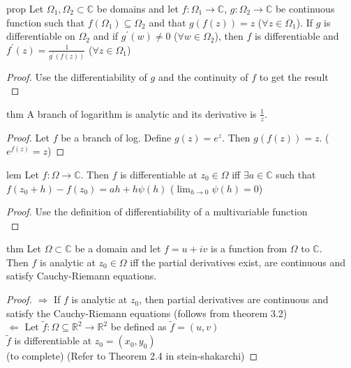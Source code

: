 \begin{restatable}[]{prop}{}\label{}
Let $\Omega_1,\Omega_2 \subset \mathds{C}$ be domains and let $f:\Omega_1\rightarrow \mathds{C}$,
$g:\Omega_2\rightarrow \mathds{C}$ be continuous function such that $f(\Omega_1)\subseteq \Omega_2$ and that $g(f(z))=z$ ($\forall z\in \Omega_1$).
If $g$ is differentiable on $\Omega_2$ and if $g^{'}(w)\neq 0$ ($\forall w \in \Omega_2$), then $f$ is differentiable and $f^{'}(z)=\frac{1}{g^{'}(f(z))}$ ($\forall z\in \Omega_1$)
\end{restatable}
\begin{proof}
Use the differentiability of $g$ and the continuity of $f$ to get the result \\
\end{proof}
\begin{restatable}[]{thm}{}\label{}
A branch of logarithm is analytic and its derivative is $\frac{1}{z}$.
\end{restatable}
\begin{proof}
Let $f$ be a branch of log. Define $g(z)=e^z$. Then $g(f(z))=z$. ($e^{f(z)}=z$)
\end{proof}
\begin{restatable}[]{lem}{}\label{}
Let $f:\Omega \rightarrow \mathds{C}$. Then $f$ is differentiable at $z_0\in \Omega$ iff $\exists a\in \mathds{C}$ such that \\
$f(z_0+h)-f(z_0)= ah+h\psi(h)$ ($\lim_{h \to 0} \psi(h)=0$)
\end{restatable}
\begin{proof}
Use the definition of differentiability of a multivariable function\\
\end{proof}
\begin{restatable}[]{thm}{}\label{}
Let $\Omega \subset \mathds{C}$ be a domain and let $f=u+iv$ is a function from $\Omega$ to $\mathds{C}$.\\
Then $f$ is analytic at $z_0\in \Omega$ iff the partial derivatives exist, are continuous and satisfy Cauchy-Riemann equations.
\end{restatable}
\begin{proof}
$\Rightarrow$ If $f$ is analytic at $z_0$, then partial derivatives are continuous and satisfy the Cauchy-Riemann equations (follows from theorem 3.2)\\
$\Leftarrow$ Let $\tilde{f}:\Omega \subseteq \mathds{R}^2\rightarrow \mathds{R}^2$ be defined as $\tilde{f}=(u,v)$\\
$\tilde{f}$ is differentiable at $z_0=(x_0,y_0)$\\
(to complete) (Refer to Theorem 2.4 in stein-shakarchi) 
\end{proof}
